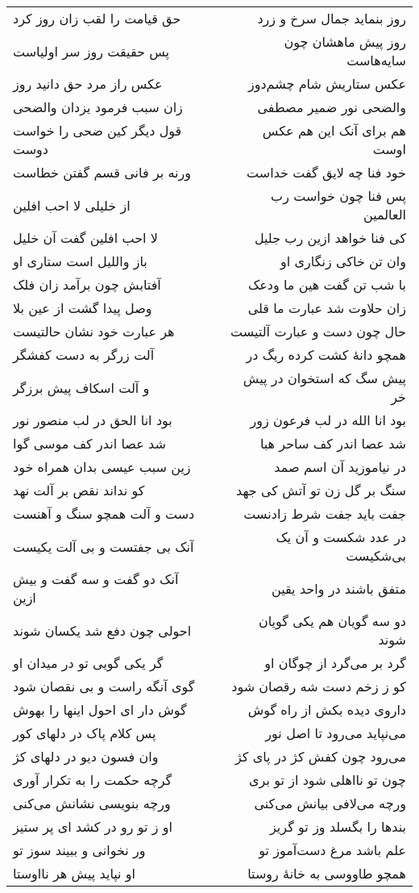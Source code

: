 \begin{center}
\begin{longtable}{l p{0.5cm} r}
\\
حق قیامت را لقب زان روز کرد
&&
روز بنماید جمال سرخ و زرد
\\
پس حقیقت روز سر اولیاست
&&
روز پیش ماهشان چون سایه‌هاست
\\
عکس راز مرد حق دانید روز
&&
عکس ستاریش شام چشم‌دوز
\\
زان سبب فرمود یزدان والضحی
&&
والضحی نور ضمیر مصطفی
\\
قول دیگر کین ضحی را خواست دوست
&&
هم برای آنک این هم عکس اوست
\\
ورنه بر فانی قسم گفتن خطاست
&&
خود فنا چه لایق گفت خداست
\\
از خلیلی لا احب افلین
&&
پس فنا چون خواست رب العالمین
\\
لا احب افلین گفت آن خلیل
&&
کی فنا خواهد ازین رب جلیل
\\
باز واللیل است ستاری او
&&
وان تن خاکی زنگاری او
\\
آفتابش چون برآمد زان فلک
&&
با شب تن گفت هین ما ودعک
\\
وصل پیدا گشت از عین بلا
&&
زان حلاوت شد عبارت ما قلی
\\
هر عبارت خود نشان حالتیست
&&
حال چون دست و عبارت آلتیست
\\
آلت زرگر به دست کفشگر
&&
همچو دانهٔ کشت کرده ریگ در
\\
و آلت اسکاف پیش برزگر
&&
پیش سگ که استخوان در پیش خر
\\
بود انا الحق در لب منصور نور
&&
بود انا الله در لب فرعون زور
\\
شد عصا اندر کف موسی گوا
&&
شد عصا اندر کف ساحر هبا
\\
زین سبب عیسی بدان همراه خود
&&
در نیاموزید آن اسم صمد
\\
کو نداند نقص بر آلت نهد
&&
سنگ بر گل زن تو آتش کی جهد
\\
دست و آلت همچو سنگ و آهنست
&&
جفت باید جفت شرط زادنست
\\
آنک بی جفتست و بی آلت یکیست
&&
در عدد شکست و آن یک بی‌شکیست
\\
آنک دو گفت و سه گفت و بیش ازین
&&
متفق باشند در واحد یقین
\\
احولی چون دفع شد یکسان شوند
&&
دو سه گویان هم یکی گویان شوند
\\
گر یکی گویی تو در میدان او
&&
گرد بر می‌گرد از چوگان او
\\
گوی آنگه راست و بی نقصان شود
&&
کو ز زخم دست شه رقصان شود
\\
گوش دار ای احول اینها را بهوش
&&
داروی دیده بکش از راه گوش
\\
پس کلام پاک در دلهای کور
&&
می‌نپاید می‌رود تا اصل نور
\\
وان فسون دیو در دلهای کژ
&&
می‌رود چون کفش کژ در پای کژ
\\
گرچه حکمت را به تکرار آوری
&&
چون تو نااهلی شود از تو بری
\\
ورچه بنویسی نشانش می‌کنی
&&
ورچه می‌لافی بیانش می‌کنی
\\
او ز تو رو در کشد ای پر ستیز
&&
بندها را بگسلد وز تو گریز
\\
ور نخوانی و ببیند سوز تو
&&
علم باشد مرغ دست‌آموز تو
\\
او نپاید پیش هر نااوستا
&&
همچو طاووسی به خانهٔ روستا
\\
\end{longtable}
\end{center}
